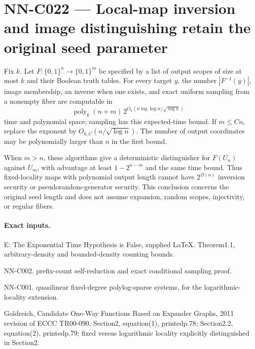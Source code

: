 \section{NN-C022 --- Local-map inversion and image distinguishing retain the original seed parameter}
\begin{proposition}[NN-C022]
Fix $k$. Let $F:\{0,1\}^n\to\{0,1\}^m$ be specified by a list of output scopes of size at most $k$ and their Boolean truth tables. For every target $y$, the number $|F^{-1}(y)|$, image membership, an inverse when one exists, and exact uniform sampling from a nonempty fiber are computable in
\[
 \operatorname{poly}_k(n+m)\,
 2^{O_k(n\log\log n/\sqrt{\log n})}
\]
time and polynomial space; sampling has this expected-time bound. If $m\leq Cn$, replace the exponent by $O_{k,C}(n/\sqrt{\log n})$. The number of output coordinates may be polynomially larger than $n$ in the first bound.

When $m>n$, these algorithms give a deterministic distinguisher for $F(U_n)$ against $U_m$, with advantage at least $1-2^{n-m}$ and the same time bound. Thus fixed-locality maps with polynomial output length cannot have $2^{\Omega(n)}$ inversion security or pseudorandom-generator security. This conclusion concerns the original seed length and does not assume expansion, random scopes, injectivity, or regular fibers.
\end{proposition}
\paragraph{Exact inputs.}
E: The Exponential Time Hypothesis is False, supplied LaTeX. Theorem1.1, arbitrary-density and bounded-density counting bounds.

NN-C002. prefix-count self-reduction and exact conditional sampling proof.

NN-C001. quasilinear fixed-degree polylog-sparse systems, for the logarithmic-locality extension.

Goldreich, Candidate One-Way Functions Based on Expander Graphs, 2011 revision of ECCC TR00-090. Section2, equation(1), printedp.78; Section2.2, equation(2), printedp.79; fixed versus logarithmic locality explicitly distinguished in Section2.

